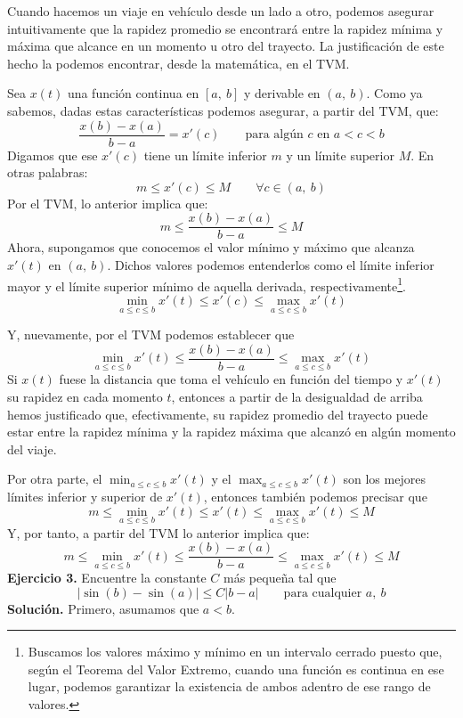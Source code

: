 \documentclass[12pt]{article}
\begin{document}
Cuando hacemos un viaje en vehículo desde un lado a otro, podemos asegurar intuitivamente que la rapidez promedio se encontrará entre la rapidez mínima y máxima que alcance en un momento u otro del trayecto. La justificación de este hecho la podemos encontrar, desde la matemática, en el TVM.

Sea $x(t)$ una función continua en $[a, \ b]$ y derivable en $(a, \ b)$. Como ya sabemos, dadas estas características podemos asegurar, a partir del TVM, que:
\[
  \frac{x(b) - x(a)}{b - a} = x'(c) \qquad \text{para algún } c \text{ en } a < c < b
\]
Digamos que ese $x'(c)$ tiene un límite inferior $m$ y un límite superior $M$. En otras palabras:
\[
  m \leq x'(c) \leq M \qquad \forall c \in (a, \ b)
\]
Por el TVM, lo anterior implica que:
\[
  m \leq \frac{x(b) - x(a)}{b - a} \leq M
\]
Ahora, supongamos que conocemos el valor mínimo y máximo que alcanza $x'(t)$ en $(a, \ b)$. Dichos valores podemos entenderlos como el límite inferior mayor y el límite superior mínimo de aquella derivada, respectivamente\footnote{Buscamos los valores máximo y mínimo en un intervalo cerrado puesto que, según el Teorema del Valor Extremo, cuando una función es continua en ese lugar, podemos garantizar la existencia de ambos adentro de ese rango de valores.}.
\[
  \min_{a \leq c \leq b} x'(t) \leq x'(c) \leq \max_{a \leq c \leq b} x'(t)
\]

\newpage

Y, nuevamente, por el TVM podemos establecer que
\[
  \min_{a \leq c \leq b} x'(t) \leq \frac{x(b) - x(a)}{b - a} \leq \max_{a \leq c \leq b} x'(t)
\]
Si $x(t)$ fuese la distancia que toma el vehículo en función del tiempo y $x'(t)$ su rapidez en cada momento $t$, entonces a partir de la desigualdad de arriba hemos justificado que, efectivamente, su rapidez promedio del trayecto puede estar entre la rapidez mínima y la rapidez máxima que alcanzó en algún momento del viaje.

Por otra parte, el $\min_{a \leq c \leq b} x'(t)$ y el $\max_{a \leq c \leq b} x'(t)$ son los mejores límites inferior y superior de $x'(t)$, entonces también podemos precisar que
\[
  m \leq \min_{a \leq c \leq b} x'(t) \leq x'(t) \leq \max_{a \leq c \leq b} x'(t) \leq M
\]
Y, por tanto, a partir del TVM lo anterior implica que:
\[
  m \leq \min_{a \leq c \leq b} x'(t) \leq \frac{x(b) - x(a)}{b - a} \leq \max_{a \leq c \leq b} x'(t) \leq M
\]
\textbf{Ejercicio 3.} \quad Encuentre la constante $C$ más pequeña tal que
\[
  \lvert \sin(b) - \sin(a) \rvert \leq C \lvert b - a \rvert \qquad \text{para cualquier } a, \ b
\]
\textbf{Solución.} \quad Primero, asumamos que $a < b$.
\end{document}
